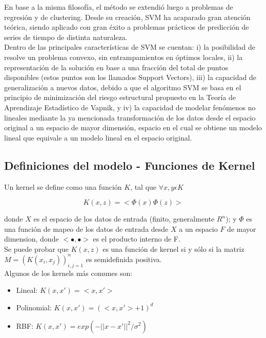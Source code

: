 	En base a la misma filosof\'{i}a, el m\'etodo se extendi\'o luego a problemas de regresi\'on y de clustering. Desde su creaci\'on, SVM ha acaparado gran atenci\'on te\'orica, siendo aplicado con gran \'exito a problemas pr\'acticos de predicci\'on de series de tiempo de distinta naturaleza. \\
	Dentro de las principales caracter\'{i}sticas de SVM se cuentan: i) la posibilidad de resolve un problema convexo, sin entrampamientos en \'optimos locales, ii) la representaci\'on de la soluci\'on en base a una fracci\'on del total de puntos disponibles (estos puntos son los llamados Support Vectors), iii) la capacidad de generalizaci\'on a nuevos datos, debido a que el algoritmo SVM se basa en el principio de minimizaci\'on del riesgo estructural propuesto en la Teor\'{i}a de Aprendizaje Estad\'{i}stico de Vapnik, y iv) la capacidad de modelar fen\'omenos no lineales mediante la ya mencionada transformaci\'on de los datos desde el espacio original a un espacio de mayor dimensi\'on, espacio en el cual se obtiene un modelo lineal que equivale a un modelo lineal en el espacio original.
\subsection{Definiciones del modelo - Funciones de Kernel}
	
	Un kernel se define como una funci\'on $K$, tal que $\forall x, y \epsilon K$
	
	\begin{equation*} 
	K(x,z) = < \Phi(x) \Phi (z) >
	\end{equation*}
	
	donde $X$ es el espacio de los datos de entrada (finito, generalmente $R^n$); y $\Phi$ es una funci\'on de mapeo de los datos de entrada desde $X$ a un espacio $F$ de mayor dimension, donde  $< \bullet , \bullet >$ es el producto interno de F. \\
	Se puede probar que $K(x,z)$ es una funci\'on de kernel si y s\'olo si la matriz $M=(K(x_i , x_j))^n_{i , j=1}$ es semidefinida positiva. \\
	Algunos de los kernels m\'as comunes son: \\
	\begin{itemize}
		\item Lineal: $K(x,x') = <x,x'>$
		\item Polinomial: $K(x,x') = (<x,x'>+1)^d $ 
		\item RBF: $K(x,x') = exp ( - ||x - x' ||^2 / \sigma^2) $
	\end{itemize}    
	
